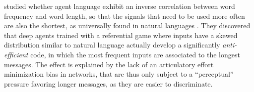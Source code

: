  studied whether agent language
exhibit an inverse correlation between word frequency and word length,
so that the signals that need to be used more often are also the
shortest, as universally found in natural languages
\cite{Zipf:1949,Strauss:etal:2007,FerrerICancho:etal:2013}. They discovered that deep agents trained with a referential game where inputs
have a skewed distribution similar to natural language actually
develop a significantly \emph{anti-efficient} code, in which the
most frequent inputs are associated to the longest messages. The
effect is explained by the lack of an articulatory effort
minimization bias in networks, that are thus only subject to a
``perceptual'' pressure favoring longer messages, as they are easier to discriminate.

